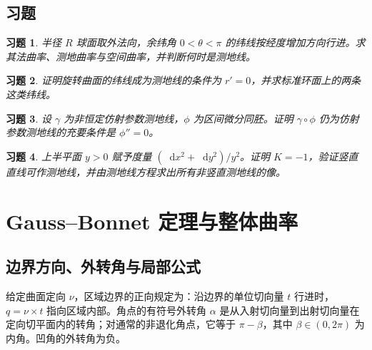 \documentclass[UTF8,12pt,a4paper,fontset=fandol]{ctexbook}
\newcommand{\dd}{\mathop{}\!\mathrm d}
\newtheorem{exercise}{习题}[chapter]
\begin{document}
\section{习题}
\begin{exercise}\label{ex:dg-geodesics-latitude}
半径 $R$ 球面取外法向，余纬角 $0<\theta<\pi$ 的纬线按经度增加方向行进。求其法曲率、测地曲率与空间曲率，并判断何时是测地线。
\end{exercise}
\begin{exercise}\label{ex:dg-geodesics-equator}
证明旋转曲面的纬线成为测地线的条件为 $r'=0$，并求标准环面上的两条这类纬线。
\end{exercise}
\begin{exercise}\label{ex:dg-geodesics-reparameter}
设 $\gamma$ 为非恒定仿射参数测地线，$\phi$ 为区间微分同胚。证明 $\gamma\circ\phi$ 仍为仿射参数测地线的充要条件是 $\phi''=0$。
\end{exercise}
\begin{exercise}\label{ex:dg-geodesics-hyperbolic}
上半平面 $y>0$ 赋予度量 $(\dd x^2+\dd y^2)/y^2$。证明 $K=-1$，验证竖直直线可作测地线，并由测地线方程求出所有非竖直测地线的像。
\end{exercise}

\chapter{Gauss--Bonnet 定理与整体曲率}
\label{chap:dg-gb}

\section{边界方向、外转角与局部公式}
给定曲面定向 $\nu$，区域边界的正向规定为：沿边界的单位切向量 $t$ 行进时，$q=\nu\times t$ 指向区域内部。角点的有符号外转角 $\alpha$ 是从入射切向量到出射切向量在定向切平面内的转角；对通常的非退化角点，它等于 $\pi-\beta$，其中 $\beta\in(0,2\pi)$ 为内角。凹角的外转角为负。
\end{document}
